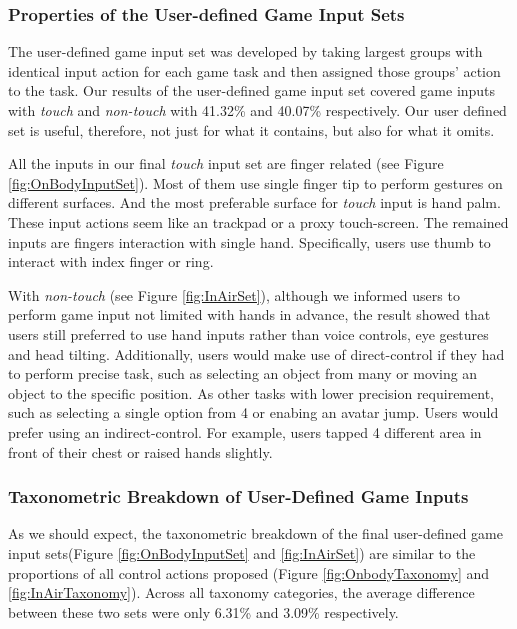 \documentclass{sigchi}
\begin{document}
   \subsubsection{Properties of the User-defined Game Input Sets}
   The user-defined game input set was developed by taking largest groups with identical input action for each game task and then assigned those groups' action to the task. 
   Our results of the user-defined game input set covered game inputs with \emph{touch} and \emph{non-touch} with 41.32\% and 40.07\% respectively. Our user defined set is useful, therefore, not just for what it contains, but also for what it omits.

      All the inputs in our final \emph{touch} input set are finger related (see Figure \ref{fig:OnBodyInputSet}). Most of them use single finger tip to perform gestures on different surfaces. And the most preferable surface for \emph{touch} input is hand palm. These input actions seem like an trackpad or a proxy touch-screen. The remained inputs are fingers interaction with single hand. Specifically, users use thumb to interact with index finger or ring.

   With \emph{non-touch} (see Figure \ref{fig:InAirSet}), although we informed users to perform game input not limited with hands in advance, the result showed that users still preferred to use hand inputs rather than voice controls, eye gestures and head tilting. Additionally, users would make use of direct-control if they had to perform precise task, such as selecting an object from many or moving an object to the specific position. As other tasks with lower precision requirement, such as selecting a single option from 4 or enabing an avatar jump. Users would prefer using an indirect-control. For example, users tapped 4 different area in front of their chest or raised hands slightly.


 

   \subsubsection{Taxonometric Breakdown of User-Defined Game Inputs}
   As we should expect, the taxonometric breakdown of the final user-defined game input sets(Figure \ref{fig:OnBodyInputSet} and \ref{fig:InAirSet}) are similar to the proportions of all control actions proposed (Figure \ref{fig:OnbodyTaxonomy} and \ref{fig:InAirTaxonomy}). Across all taxonomy categories, the average difference between these two sets were only 6.31\% and 3.09\% respectively.
\end{document}
